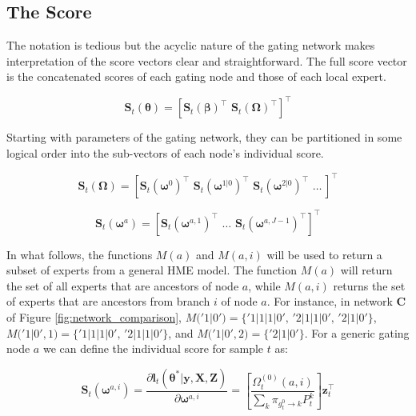 \documentclass[12pt]{article}
\newcommand{\bw}[1]{\boldsymbol{\omega}^{#1}}
\newcommand{\gateprod}[2]{\pi_{#1 \longrightarrow #2}}
\newcommand{\FnOmegaNaught}[2]{\Omega^{(0)}_{t}( #1, #2 )}
\theoremstyle{definition}
\begin{document}
\subsection{The Score} \label{sec:TheScore}

The notation is tedious but the acyclic nature of the gating network makes interpretation of the score vectors clear and straightforward. The full score vector is the concatenated scores of each gating node and those of each local expert.

\begin{equation}
  \boldsymbol{S}_{t}(\boldsymbol{\theta}) = [ \boldsymbol{S}_{t}(\boldsymbol{\beta})^{\top} \,\, \boldsymbol{S}_{t}(\boldsymbol{\Omega})^{\top} ]^{\top}
\end{equation}

Starting with parameters of the gating network, they can be partitioned in some logical order into the sub-vectors of each node's individual score.

\begin{equation}
  \boldsymbol{S}_{t}(\boldsymbol{\Omega}) = [ \boldsymbol{S}_{t}(\boldsymbol{\omega}^{0})^{\top} \,\, \boldsymbol{S}_{t}(\boldsymbol{\omega}^{1 | 0})^{\top} \,\, \boldsymbol{S}_{t}(\boldsymbol{\omega}^{2 | 0})^{\top} \,\, \ldots \, ]^{\top}
\end{equation}

\begin{equation}
  \boldsymbol{S}_{t}(\boldsymbol{\omega}^{a}) = [ \boldsymbol{S}_{t}(\bw{a, 1})^{\top} \,\, \ldots \,\, \boldsymbol{S}_{t}(\bw{a, J - 1})^{\top} ]^{\top}
\end{equation}

In what follows, the functions $M(a)$ and $M(a, i)$ will be used to return a subset of experts from a general HME model. The function $M(a)$ will return the set of all experts that are ancestors of node $a$, while $M(a, i)$ returns the set of experts that are ancestors from branch $i$ of node $a$. For instance, in network $\boldsymbol{C}$ of Figure \ref{fig:network_comparison}, $M('1|0') = \{'1|1|1|0', \, '2|1|1|0', \, '2|1|0'\}$, $M('1|0', 1) = \{'1|1|1|0', \, '2|1|1|0'\}$, and $M('1|0', 2) = \{'2|1|0'\}$. For a generic gating node $a$ we can define the individual score for sample $t$ as:

\begin{equation} \label{eq:gateScore}
  \boldsymbol{S}_{t}(\bw{a, i}) = \frac{\partial \boldsymbol{l}_{t}(\boldsymbol{\theta}^{*}| \boldsymbol{y}, \boldsymbol{X}, \boldsymbol{Z}) }{\partial \boldsymbol{\omega}^{a,i}} = \left[ \frac{ \FnOmegaNaught{a}{i} }{ \sum_{k} \gateprod{g^{0}_{t}}{k} P^{k}_{t} } \right] \boldsymbol{z}_{t}^{\top} 
\end{equation}
\end{document}
